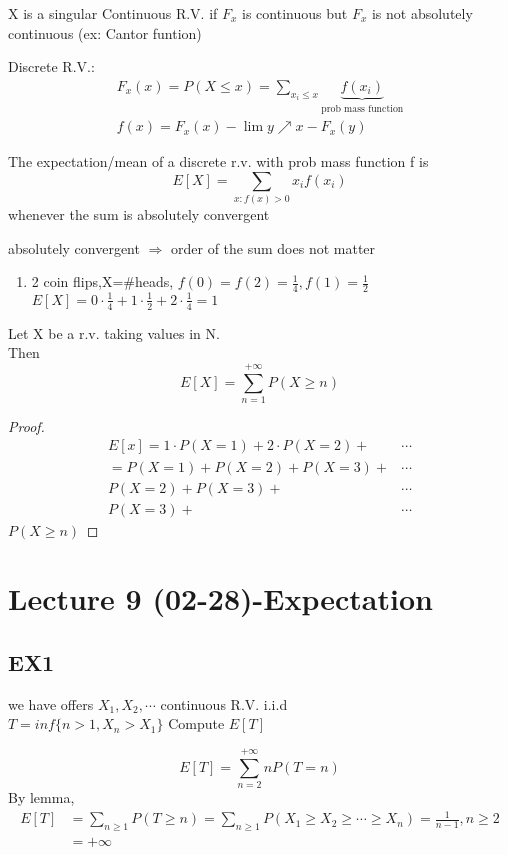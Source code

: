 \begin{remark}[]{}
X is a singular Continuous R.V. if $ F_x $ is continuous but $ F_x $ is not absolutely continuous (ex: Cantor funtion)
\end{remark}
Discrete R.V.:
\begin{align*}{}{}
F_x(x)=P(X\leq x)=\sum_{x_i\leq x}\underbrace{f(x_i)}_{\text{prob mass function}}\\
f(x)=F_x(x)-\lim{y\nearrow  x-}F_x(y)
\end{align*}
\begin{definition}[]{}
The expectation/mean of a discrete r.v. with prob mass function f is  $$
    E[X]=\sum_{x:f(x)>0}x_if(x_i)$$ whenever the sum is absolutely convergent
\end{definition}
\begin{remark}[]{}
    absolutely convergent $ \Rightarrow $ order of the sum does not matter
\end{remark}
\begin{example}[]{}
 \begin{enumerate}[label=\circled{\arabic*}] 
 \item 2 coin flips,X=\#heads, $ f(0)=f(2)=\frac{1}{4},f(1)=\frac{1}{2} $
 \\$ E[X]=0\cdot\frac{1}{4}+1\cdot\frac{1}{2}+2\cdot\frac{1}{4}=1 $
 \end{enumerate}
\end{example}
\begin{lemma}[]{}
Let X be a r.v. taking values in N.
\\Then $$
    E[X]=\sum_{n=1}^{+\infty}P(X\geq n)
$$ 
\end{lemma}
\begin{proof}
    \begin{align*}{}{}
    E[x]=1\cdot P(X=1)+2\cdot P(X=2)+&\cdots\\
    =P(X=1)+P(X=2)+P(X=3)+&\cdots\\
    P(X=2)+P(X=3)+&\cdots\\
    P(X=3)+&\cdots
    \end{align*}
    $ P(X\geq n) $ 
\end{proof}
\section{Lecture 9 (02-28)-{Expectation}}
\subsection*{EX1}
we have offers $ X_1,X_2,\cdots $ continuous R.V. i.i.d
\\$ T=inf\{n>1,X_n>X_1\} $  Compute $ E[T] $
\begin{solution}
    $$
    E[T]=\sum_{n=2}^{+\infty}nP(T= n)
    $$
    By lemma,\begin{align*}{}{}
        E[T]&=\sum_{n\geq1}P(T\geq n)=\sum_{n\geq1}P(X_1\geq X_2\geq\cdots\geq X_n)=\frac{1}{n-1},n\geq2\\
        &=+\infty
    \end{align*}
\end{solution}
